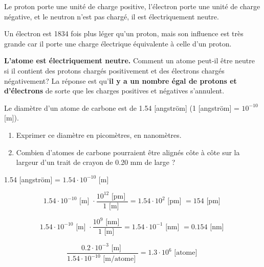\documentclass[
  11pt,
  a4paper,
  openany]{book}
\providecommand{\tightlist}{%
  \setlength{\itemsep}{0pt}\setlength{\parskip}{0pt}}
\begin{document}
Le proton porte une unité de charge positive, l'électron porte une unité de charge négative, et le neutron n'est pas chargé, il est électriquement neutre.

Un électron est 1834 fois plus léger qu'un proton, mais son influence est très grande car il porte une charge électrique équivalente à celle d'un proton.

\textbf{L'atome est électriquement neutre.} Comment un atome peut-il être neutre si il contient des protons chargés positivement et des électrons chargés négativement? La réponse est qu'\textbf{il y a un nombre égal de protons et d'électrons} de sorte que les charges positives et négatives s'annulent.

\begin{Exercise}

Le diamètre d'un atome de carbone est de 1.54 {[}angström{]} (1 {[}angström{]} = \(10^{-10}\) {[}m{]}).

\begin{enumerate}
\def\labelenumi{\arabic{enumi}.}
\tightlist
\item
  Exprimer ce diamètre en picomètres, en nanomètres.
\item
  Combien d'atomes de carbone pourraient être alignés côte à côte sur la largeur d'un trait de crayon de 0.20 mm de large ?
\end{enumerate}

\end{Exercise}

\begin{Answer}
1.54 {[}angström{]} = \(1.54\cdot10^{-10}\) {[}m{]}

\[ 1.54\cdot10^{-10} \text{ [m] } \cdot \frac{ 10^{12}\text{ [pm] }}{1\text{ [m] }} = 1.54\cdot10^{2} \text{ [pm] } = 154 \text{ [pm] } \]

\[ 1.54\cdot10^{-10} \text{ [m] } \cdot \frac{ 10^{9}\text{ [nm] }}{1\text{ [m] }} = 1.54\cdot10^{-1} \text{ [nm] } = 0.154 \text{ [nm] } \]

\[ \frac{0.2\cdot10^{-3} \text{ [m] }}{1.54\cdot10^{-10} \text{ [m/atome] }} = 1.3\cdot10^6 \text{ [atome] } \]

\end{Answer}

\newpage
\end{document}
